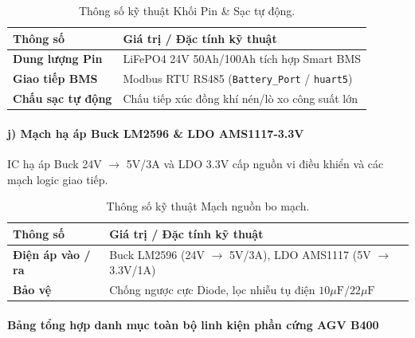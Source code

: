 \documentclass{article}
\begin{document}
\begin{table}[!htbp]
\centering
\begin{tabularx}{\textwidth}{|>{\bfseries}l|X|}
\hline
\rowcolor{lightgray} Thông số & Giá trị / Đặc tính kỹ thuật \\ \hline
Dung lượng Pin & LiFePO4 24V 50Ah/100Ah tích hợp Smart BMS \\ \hline
Giao tiếp BMS & Modbus RTU RS485 (\texttt{Battery\_Port} / \texttt{huart5}) \\ \hline
Chấu sạc tự động & Chấu tiếp xúc đồng khí nén/lò xo công suất lớn \\ \hline
\end{tabularx}
\caption{Thông số kỹ thuật Khối Pin \& Sạc tự động.}
\label{tab:spec_battery}
\end{table}

\paragraph{j) Mạch hạ áp Buck LM2596 \& LDO AMS1117-3.3V}
IC hạ áp Buck 24V $\rightarrow$ 5V/3A và LDO 3.3V cấp nguồn vi điều khiển và các mạch logic giao tiếp.

\begin{table}[!htbp]
\centering
\begin{tabularx}{\textwidth}{|>{\bfseries}l|X|}
\hline
\rowcolor{lightgray} Thông số & Giá trị / Đặc tính kỹ thuật \\ \hline
Điện áp vào / ra & Buck LM2596 (24V $\rightarrow$ 5V/3A), LDO AMS1117 (5V $\rightarrow$ 3.3V/1A) \\ \hline
Bảo vệ & Chống ngược cực Diode, lọc nhiễu tụ điện $10\mu\text{F} / 22\mu\text{F}$ \\ \hline
\end{tabularx}
\caption{Thông số kỹ thuật Mạch nguồn bo mạch.}
\label{tab:spec_pwr}
\end{table}

\paragraph{Bảng tổng hợp danh mục toàn bộ linh kiện phần cứng AGV B400}
\end{document}
